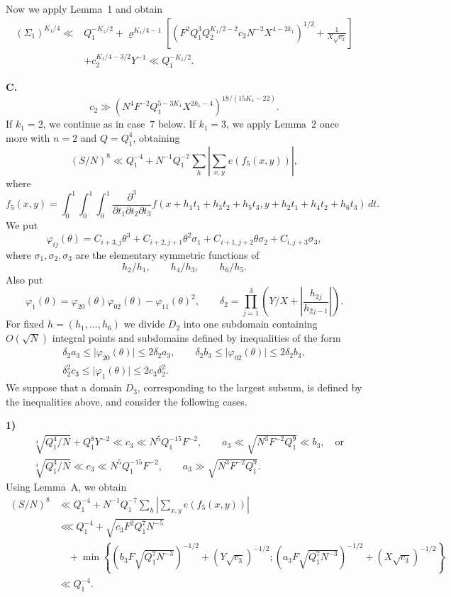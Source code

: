 \documentclass[10pt]{article}
\begin{document}
Now we apply Lemma~1 and obtain
\[
\begin{aligned}
(\Sigma_1)^{K_1/4}\ll{}&Q_1^{-K_1/2}
+\varrho^{K_1/4-1}\left[
 (F^2Q_1^3Q_2^{K_1/2-2}c_2N^{-2}X^{4-2k_1})^{1/2}
 +\frac1{X\sqrt{c_2}}
 \right]\\
&+c_2^{K_1/4-3/2}Y^{-1}
\ll Q_1^{-K_1/2}.
\end{aligned}
\]

\medskip
\noindent\textbf{C.}
\[
  c_2\gg
  (N^4F^{-2}Q_1^{5-3K_1}X^{2k_1-4})^{18/(15K_1-22)}.
\]
If $k_1=2$, we continue as in case~7 below. If $k_1=3$, we apply Lemma~2 once more with $n=2$ and $Q=Q_1^4$, obtaining
\[
  (S/N)^8\ll Q_1^{-4}
  +N^{-1}Q_1^{-7}\sum_h
   \left\lvert\sum_{x,y}e(f_5(x,y))\right\rvert,
\]
where
\[
  f_5(x,y)=\int_0^1\!\int_0^1\!\int_0^1
  \frac{\partial^3}{\partial t_1\partial t_2\partial t_3}
  f(x+h_1t_1+h_3t_2+h_5t_3,
    y+h_2t_1+h_4t_2+h_6t_3)\,dt.
\]
We put
\[
  \varphi_{ij}(\theta)=
  C_{i+3,j}\theta^3+C_{i+2,j+1}\theta^2\sigma_1
  +C_{i+1,j+2}\theta\sigma_2+C_{i,j+3}\sigma_3,
\]
where $\sigma_1,\sigma_2,\sigma_3$ are the elementary symmetric functions of
\[
  h_2/h_1,\qquad h_4/h_3,\qquad h_6/h_5.
\]
Also put
\[
  \varphi_1(\theta)=
  \varphi_{20}(\theta)\varphi_{02}(\theta)
  -\varphi_{11}(\theta)^2,
  \qquad
  \delta_2=\prod_{j=1}^3
  \left(Y/X+\left\lvert\frac{h_{2j}}{h_{2j-1}}\right\rvert\right).
\]
For fixed $h=(h_1,\ldots,h_6)$ we divide $D_2$ into one subdomain containing $O(\sqrt N)$ integral points and subdomains defined by inequalities of the form
\[
\begin{gathered}
 \delta_2a_3\leqslant\lvert\varphi_{20}(\theta)\rvert
 \leqslant2\delta_2a_3,\qquad
 \delta_2b_3\leqslant\lvert\varphi_{02}(\theta)\rvert
 \leqslant2\delta_2b_3,\\
 \delta_2^2c_3\leqslant\lvert\varphi_1(\theta)\rvert
 \leqslant2c_3\delta_2^2.
\end{gathered}
\]
We suppose that a domain $D_3$, corresponding to the largest subsum, is defined by the inequalities above, and consider the following cases.

\medskip
\noindent\textbf{1)}
\[
\begin{aligned}
&\sqrt[4]{Q_1^4/N}+Q_1^8Y^{-2}\ll c_3
 \ll N^5Q_1^{-15}F^{-2},
 \qquad
 a_3\ll\sqrt{N^3F^{-2}Q_1^9}\ll b_3,
 \quad\text{or}\\
&\sqrt[4]{Q_1^4/N}\ll c_3
 \ll N^5Q_1^{-15}F^{-2},
 \qquad
 a_3\gg\sqrt{N^3F^{-2}Q_1^9}.
\end{aligned}
\]
Using Lemma~A, we obtain
\[
\begin{aligned}
(S/N)^8
&\ll Q_1^{-4}+N^{-1}Q_1^{-7}\sum_h
 \left\lvert\sum_{x,y}e(f_5(x,y))\right\rvert\\
&\lll Q_1^{-4}+\sqrt{c_3F^2Q_1^7N^{-5}}\\
&\quad+\min\left\{
 (b_3F\sqrt{Q_1^7N^{-3}})^{-1/2}+(Y\sqrt{c_3})^{-1/2};
 (a_3F\sqrt{Q_1^7N^{-3}})^{-1/2}+(X\sqrt{c_3})^{-1/2}
 \right\}\\
&\ll Q_1^{-4}.
\end{aligned}
\]
\end{document}

